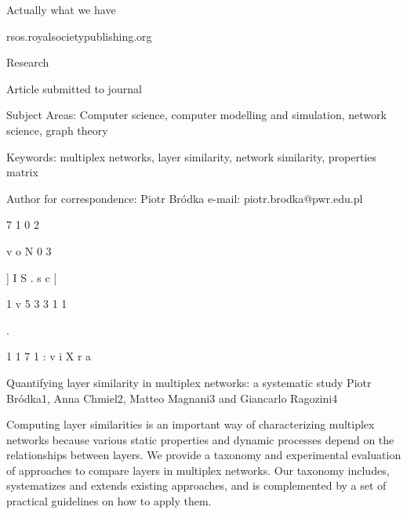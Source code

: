\documentclass{beamer}
\begin{document}
\begingroup
\scriptsize
\begin{frame}{Actually what we have}

  rsos.royalsocietypublishing.org

  Research

  Article submitted to journal

  Subject Areas:
  Computer science, computer
  modelling and simulation, network
  science, graph theory

  Keywords:
  multiplex networks, layer similarity,
  network similarity, properties matrix

  Author for correspondence:
  Piotr Bródka
  e-mail: piotr.brodka@pwr.edu.pl

  7
  1
  0
  2



  v
  o
  N
  0
  3





  ]
  I
  S
  .
  s
  c
  [



  1
  v
  5
  3
  3
  1
  1

  .

  1
  1
  7
  1
  :
  v
  i
  X
  r
  a

  Quantifying layer similarity in
  multiplex networks:
  a systematic study
  Piotr Bródka1, Anna Chmiel2,
  Matteo Magnani3 and Giancarlo
  Ragozini4



  Computing layer similarities is an important way of
  characterizing multiplex networks because various
  static properties and dynamic processes depend
  on the relationships between layers. We provide a
  taxonomy and experimental evaluation of approaches
  to compare layers in multiplex networks. Our
  taxonomy includes, systematizes and extends existing
  approaches, and is complemented by a set of practical
  guidelines on how to apply them.

\end{frame}
\endgroup
\end{document}

